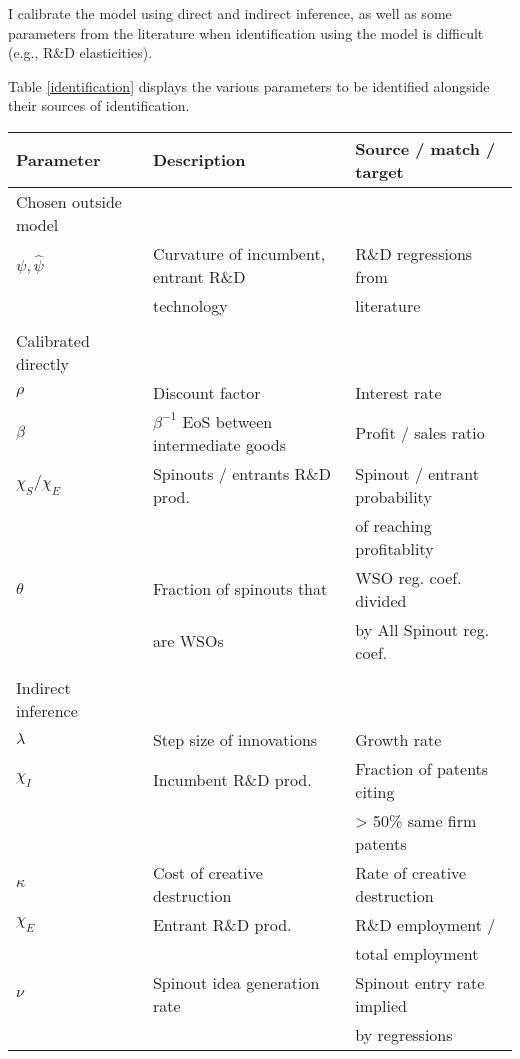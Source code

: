 \documentclass[12pt,english]{article}
\theoremstyle{remark}
\begin{document}
I calibrate the model using direct and indirect inference, as well as some parameters from the literature when identification using the model is difficult (e.g., R\&D elasticities). 

Table \ref{identification} displays the various parameters to be identified alongside their sources of identification. 

\begin{center}
	\footnotesize
	\begin{tabular}{lll}
		\hline 
		Parameter &  Description & Source / match / target \\
		\hline 
		Chosen outside model & \\
		$\psi, \hat{\psi}$ & Curvature of incumbent, entrant R\&D & R\&D regressions from \\
		& technology & literature\\
		& & \\
		Calibrated directly &  \\
		$\rho$ & Discount factor & Interest rate \\
		$\beta$ & $\beta^{-1}$ EoS between intermediate goods & Profit / sales ratio \\
		$\chi_S / \chi_E$ & Spinouts / entrants R\&D prod. & Spinout / entrant probability \\
		& & of reaching profitablity \\
		$\theta$ & Fraction of spinouts that & WSO reg. coef. divided \\
		& are WSOs & by All Spinout reg. coef. \\
		& \\
		Indirect inference & \\
		$\lambda$ & Step size of innovations & Growth rate \\
		$\chi_I$ & Incumbent R\&D prod. & Fraction of patents citing \\
		& & > 50\% same firm patents \\
		$\kappa$ & Cost of creative destruction & Rate of creative destruction \\
		$\chi_E$ & Entrant R\&D prod. & R\&D employment / \\
		& & total employment \\
		$\nu$ & Spinout idea generation rate & Spinout entry rate implied \\
		& & by regressions \\
		\hline
	\end{tabular}
	\label{identification}
\end{center}
\end{document}
